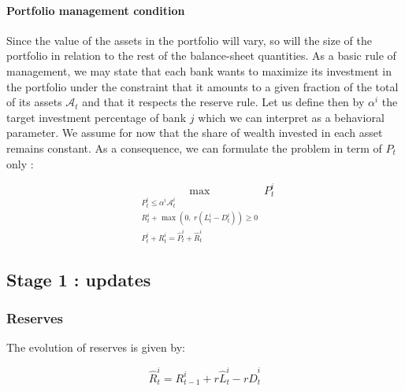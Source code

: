\documentclass{article}
\newcommand{\othernote}[1]{\textcolor{darkgreen}{\textit{Dimitri: #1}}}
\newcommand{\wh}{\widehat}
\begin{document}


\paragraph{Portfolio management condition}
Since the value of the assets in the portfolio will vary, so will the size of the portfolio in relation to the rest of the balance-sheet quantities. As a basic rule of management, we may state that each bank wants to maximize its investment in the portfolio under the constraint that it amounts to a given fraction of the total of its assets $\mathcal{A}_t$ and that it respects the reserve rule. Let us define then by $\alpha^i$ the target investment percentage of bank $j$ which we can interpret as a behavioral parameter. We assume for now that the share of wealth invested in each asset remains constant. As a consequence, we  can formulate the problem in term of $P_t$ only :

$$\max_{\substack{P_t^i \leq \alpha^i \mathcal{A}_t^i \\ R_t^i + \max(0,~r(L_t^i - D_t^i)) \geq 0 \\ P_t^i + R_t^i = \widehat{P}_t^i + \widehat{R}_t^i}} P_t^i$$


\subsection{Stage 1 : updates}\label{updates}

\subsubsection{Reserves}

The evolution of reserves is given by: 

\begin{equation}\label{eq:rsv}
\widehat{R}_t^i = R_{t-1}^i + r \wh L_t^i - r \wh D_t^i
\end{equation}

\end{document}
